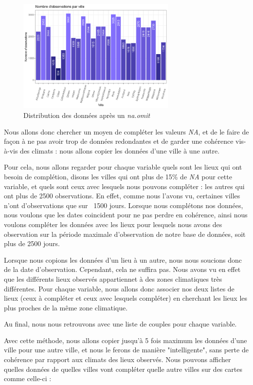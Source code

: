 \documentclass{article}
\begin{document}
\begin{figure}[H]
    \centering
    \includegraphics[width=0.7\textwidth]{Images/distribution_lieux_raw.png}
    \caption{Distribution des données après un \emph{na.omit}}
\end{figure}

Nous allons donc chercher un moyen de compléter les valeurs \emph{NA}, et de le faire de façon à ne pas avoir trop de données redondantes et de garder une cohérence vis-à-vis des climats : nous allons copier les données d'une ville à une autre.

Pour cela, nous allons regarder pour chaque variable quels sont les lieux qui ont besoin de complétion, disons les villes qui ont plus de 15\% de \emph{NA} pour cette variable, et quels sont ceux avec lesquels nous pouvons compléter : les autres qui ont plus de 2500 observations. En effet, comme nous l'avons vu, certaines villes n'ont d'observations que sur ~1500 jours. Lorsque nous complétons nos données, nous voulons que les dates coincident pour ne pas perdre en cohérence, ainsi nous voulons compléter les données avec les lieux pour lesquels nous avons des observation sur la période maximale d'observation de notre base de données, soit plus de 2500 jours. 

Lorsque nous copions les données d'un lieu à un autre, nous nous soucions donc de la date d'observation. Cependant, cela ne suffira pas. Nous avons vu en effet que les différents lieux observés appartiennet à des zones climatiques très différentes. Pour chaque variable, nous allons donc associer nos deux listes de lieux (ceux à compléter et ceux avec lesquels compléter) en cherchant les lieux les plus proches de la même zone climatique.

Au final, nous nous retrouvons avec une liste de couples pour chaque variable.

Avec cette méthode, nous allons copier jusqu'à 5 fois maximum les données d'une ville pour une autre ville, et nous le ferons de manière "intelligente", sans perte de cohérence par rapport aux climats des lieux observés. Nous pouvons afficher quelles données de quelles villes vont compléter quelle autre villes sur des cartes comme celle-ci :
\end{document}
